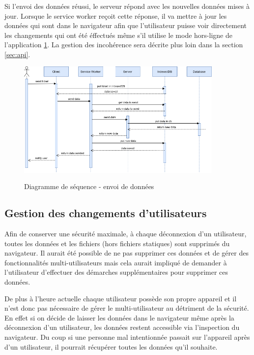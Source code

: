 \documentclass{EPL-master-thesis-covers-FR}
\begin{document}
					Si l'envoi des données réussi, le serveur répond avec les nouvelles données mises à jour. Lorsque le service worker reçoit cette réponse, il va mettre à jour les données qui sont dans le navigateur afin que l'utilisateur puisse voir directement les changements qui ont été éffectués même s'il utilise le mode hors-ligne de l'application \ref{fig:flows2}. La gestion des incohérence sera décrite plus loin dans la section \ref{sec:api}.
					
					\begin{figure}[H]
						\centering
						\includegraphics[width=0.9\textwidth]{images/flow2}
						\label{fig:flows2}
						\caption{Diagramme de séquence - envoi de données}
					\end{figure}
			
			\subsection{Gestion des changements d'utilisateurs}		
				Afin de conserver une sécurité maximale, à chaque déconnexion d'un utilisateur, toutes les données et les fichiers (hors fichiers statiques) sont supprimés du navigateur. Il aurait été possible de ne pas supprimer ces données et de gérer des fonctionnalités multi-utilisateurs mais cela aurait impliqué de demander à l'utilisateur d'effectuer des démarches supplémentaires pour supprimer ces données. 
			
				De plus à l'heure actuelle chaque utilisateur possède son propre appareil et il n'est donc pas nécessaire de gérer le multi-utilisateur au détriment de la sécurité. En effet si on décide de laisser les données dans le navigateur même après la déconnexion d'un utilisateur, les données restent accessible via l'inspection du navigateur. Du coup si une personne mal intentionnée  passait sur l'appareil après d'un utilisateur, il pourrait récupérer toutes les données qu'il souhaite. 
				
\end{document}
